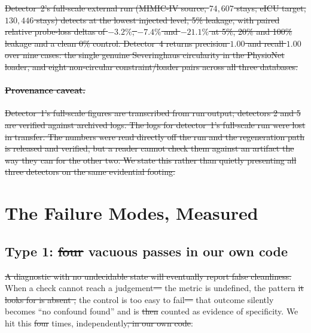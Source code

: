 \documentclass[pmlr,twocolumn,10pt]{jmlr}
\DeclareRobustCommand{\DIFadd}[1]{{\color{blue}\uwave{#1}}} %
\DeclareRobustCommand{\DIFdel}[1]{{\color{red}\sout{#1}}} %
\providecommand{\DIFaddbegin}{} %
\providecommand{\DIFaddend}{} %
\providecommand{\DIFdelbegin}{} %
\providecommand{\DIFdelend}{} %
\begin{document}
\DIFdelbegin \DIFdel{Detector~2's full-scale external run (MIMIC-IV source, $74{,}607$ stays; eICU
target, $130{,}446$ stays) detects at the lowest injected level, 5\% leakage,
with paired relative probe-loss deltas of $-3.2\%$, $-7.4\%$ and $-21.1\%$ at
5\%, 20\% and 100\% leakage and a clean 0\% control. Detector~4 returns
precision $1.00$ and recall $1.00$ over nine cases: the single genuine
Severinghaus circularity in the PhysioNet loader, and eight non-circular
constraint/loader pairs across all three databases.
}%

\paragraph{\DIFdel{Provenance caveat.}} %
\addtocounter{paragraph}{-1}%
\DIFdel{Detector~1's full-scale figures are transcribed
from run output; detectors 2 and 5 are verified against archived logs. The logs
for detector~1's full-scale run were lost in transfer. The numbers were read
directly off the run and the regeneration path is released and verified, but a
reader cannot check them against an artifact the way they can for the other two.
We state this rather than quietly presenting all three detectors on the same
evidential footing.
}%

\DIFdelend \section{The Failure Modes, Measured}
\label{sec:measured}

\subsection{Type 1: \DIFdelbegin \DIFdel{four }\DIFdelend \DIFaddbegin \DIFadd{five }\DIFaddend vacuous passes in our own code}

\DIFdelbegin \DIFdel{A diagnostic with no undecidable state will eventually report false
cleanliness. }\DIFdelend When a check cannot reach a judgement\DIFdelbegin \DIFdel{--- }\DIFdelend \DIFaddbegin \DIFadd{, because }\DIFaddend the metric is undefined, the
pattern \DIFdelbegin \DIFdel{it looks for is absent , }\DIFdelend \DIFaddbegin \DIFadd{is absent or }\DIFaddend the control is too easy to fail\DIFdelbegin \DIFdel{--- }\DIFdelend \DIFaddbegin \DIFadd{, }\DIFaddend that outcome silently
becomes ``no confound found'' and is \DIFdelbegin \DIFdel{then }\DIFdelend counted as evidence of specificity. We hit
this \DIFdelbegin \DIFdel{four }\DIFdelend \DIFaddbegin \DIFadd{five }\DIFaddend times, independently\DIFdelbegin \DIFdel{, in our own code}\DIFdelend :
\end{document}
